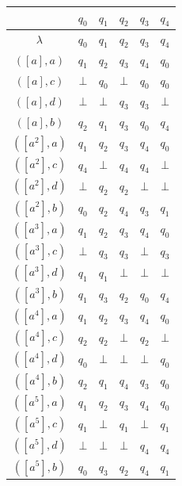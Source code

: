 \documentclass[a4paper,12pt,numbers=noenddot]{scrreport}
\begin{document}
\begin{center}
    \begin{tabular}{ c | c c c c c }
        ~               & $q_0$         & $q_1$       & $q_2$       & $q_3$       & $q_4$\\
        \hline
        $\lambda$         & $q_0$         & $q_1$       & $q_2$       & $q_3$       & $q_4$ \\
        $([a], a)$      & $q_1$         & $q_2$       & $q_3$       & $q_4$       & $q_0$ \\
        $([a], c)$      & $\bot$        & $q_0$       & $\bot$      & $q_0$       & $q_0$ \\
        $([a], d)$      & $\bot$        & $\bot$      & $q_3$       & $q_3$       & $\bot$ \\
        $([a], b)$      & $q_2$          & $q_1$        & $q_3$        & $q_0$          & $q_4$ \\
        $([a^2], a)$    & $q_1$        & $q_2$        & $q_3$        & $q_4$        & $q_0$ \\
        $([a^2], c)$    & $q_4$        & $\bot$        & $q_4$        & $q_4$        & $\bot$ \\
        $([a^2], d)$    & $\bot$        & $q_2$        & $q_2$        & $\bot$        & $\bot$ \\
        $([a^2], b)$      & $q_0$          & $q_2$        & $q_4$        & $q_3$          & $q_1$ \\
        $([a^3], a)$    & $q_1$        & $q_2$        & $q_3$        & $q_4$        & $q_0$ \\
        $([a^3], c)$    & $\bot$        & $q_3$        & $q_3$        & $\bot$        & $q_3$ \\
        $([a^3], d)$    & $q_1$        & $q_1$        & $\bot$        & $\bot$        & $\bot$ \\
        $([a^3], b)$      & $q_1$          & $q_3$        & $q_2$        & $q_0$          & $q_4$ \\
        $([a^4], a)$    & $q_1$        & $q_2$            & $q_3$          & $q_4$      & $q_0$ \\
        $([a^4], c)$    & $q_2$        & $q_2$            & $\bot$          & $q_2$      & $\bot$ \\
        $([a^4], d)$    & $q_0$        & $\bot$           & $\bot$          & $\bot$      & $q_0$ \\
        $([a^4], b)$      & $q_2$          & $q_1$        & $q_4$        & $q_3$          & $q_0$ \\
        $([a^5], a)$    & $q_1$        & $q_2$            & $q_3$          & $q_4$      & $q_0$ \\
        $([a^5], c)$    & $q_1$        & $\bot$            & $q_1$          & $\bot$     & $q_1$ \\
        $([a^5], d)$    & $\bot$        & $\bot$           & $\bot$         & $q_4$      & $q_4$ \\
        $([a^5], b)$      & $q_0$          & $q_3$        & $q_2$        & $q_4$          & $q_1$ \\
    \end{tabular}
\end{center}
\end{document}
